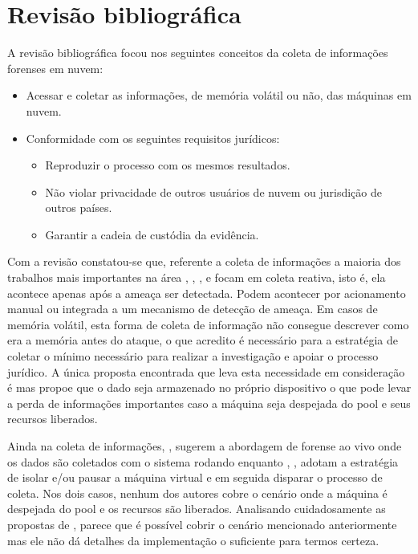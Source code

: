\documentclass[12pt,				%
	openright,			%
	oneside,			%
	a4paper,			%
	english,			%
	brazil				%
	]{abntex2}
\begin{document}
\chapter{Revisão bibliográfica} \label{chap:related}
A revisão bibliográfica focou nos seguintes conceitos da coleta de informações forenses em nuvem:

\begin{itemize}
 \item Acessar e coletar as informações, de memória volátil ou não, das máquinas em nuvem.
 \item Conformidade com os seguintes requisitos jurídicos: 
 \begin{itemize}
  \item Reproduzir o processo com os mesmos resultados.
  \item Não violar privacidade de outros usuários de nuvem ou jurisdição de outros países.
  \item Garantir a cadeia de custódia da evidência.
 \end{itemize}
\end{itemize}

Com a revisão constatou-se que, referente a coleta de informações a maioria dos trabalhos mais importantes na área \cite{Reichert2015}, \cite{Poisel2013}, \cite{Dykstra2013}, 
\cite{George2012} e \cite{Sang2013} focam em coleta reativa, isto é, ela acontece apenas após a ameaça ser detectada. Podem acontecer por acionamento manual ou integrada a um 
mecanismo de detecção de ameaça. Em casos de memória volátil, esta forma de coleta de informação não consegue descrever como era a memória antes do ataque, o que acredito é 
necessário para a estratégia de coletar o mínimo necessário para realizar a investigação e apoiar o processo jurídico. A única proposta encontrada que leva esta necessidade 
em consideração é \cite{Dezfouli2012} mas propoe que o dado seja armazenado no próprio dispositivo o que pode levar a perda de informações importantes caso a máquina seja 
despejada do pool e seus recursos liberados.

Ainda na coleta de informações, \cite{Reichert2015}, \cite{George2012} sugerem a abordagem de forense ao vivo onde os dados são coletados com o sistema rodando enquanto 
\cite{Poisel2013}, \cite{Dykstra2013}, \cite{Sang2013} adotam a estratégia de isolar e/ou pausar a máquina virtual e em seguida disparar o processo de coleta. Nos dois casos, 
nenhum dos autores cobre o cenário onde a máquina é despejada do pool e os recursos são liberados. Analisando cuidadosamente as propostas de \cite{Poisel2013}, parece que é possível
cobrir o cenário mencionado anteriormente mas ele não dá detalhes da implementação o suficiente para termos certeza.
\end{document}
